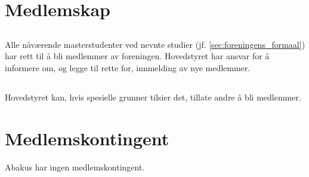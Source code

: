 \section{Medlemskap}

\subsection{}
Alle nåværende masterstudenter ved nevnte studier (jf. \ref{sec:foreningens_formaal}) har rett til å bli medlemmer av foreningen. 
Hovedstyret har ansvar for å informere om, og legge til rette for, innmelding av nye medlemmer.

\subsection{}
Hovedstyret kan, hvis spesielle grunner tilsier det, tillate andre å bli medlemmer. 

\section{Medlemskontingent}
Abakus har ingen medlemskontingent.
